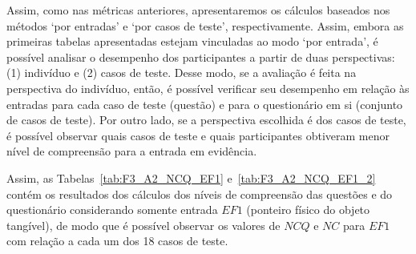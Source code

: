 Assim, como nas métricas anteriores, apresentaremos os cálculos baseados nos métodos `por entradas' e `por casos de teste', respectivamente. Assim, embora as primeiras tabelas apresentadas estejam vinculadas ao modo `por entrada', é possível analisar o desempenho dos participantes a partir de duas perspectivas: (1) indivíduo e (2) casos de teste. Desse modo, se a avaliação é feita na perspectiva do indivíduo, então, é possível verificar seu desempenho em relação às entradas para cada caso de teste (questão) e para o questionário em si (conjunto de casos de teste). Por outro lado, se a perspectiva escolhida é dos casos de teste, é possível observar quais casos de teste e quais participantes obtiveram menor nível de compreensão para a entrada em evidência.

Assim, as Tabelas~\ref{tab:F3_A2_NCQ_EF1} e~\ref{tab:F3_A2_NCQ_EF1_2} contém os resultados dos cálculos dos níveis de compreensão das questões e do questionário considerando somente entrada $EF1$ (ponteiro físico do objeto tangível), de modo que é possível observar os valores de $NCQ$ e $NC$ para $EF1$ com relação a cada um dos 18 casos de teste.

